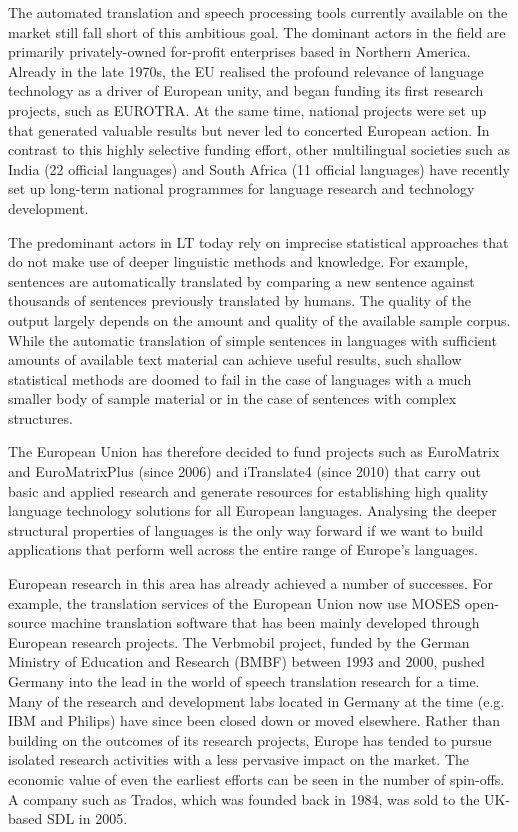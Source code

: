 \documentclass[]{../../metanetpaper}
\begin{document}
\begin{multicols}{2}

    The automated translation and speech processing tools currently available on the market still fall short of this ambitious goal. The dominant actors in the field are primarily privately-owned for-profit enterprises based in Northern America. Already in the late 1970s, the EU realised the profound relevance of language technology as a driver of European unity, and began funding its first research projects, such as EUROTRA. At the same time, national projects were set up that generated valuable results but never led to concerted European action. In contrast to this highly selective funding effort, other multilingual societies such as India (22 official languages) and South Africa (11 official languages) have recently set up long-term national programmes for language research and technology development. 

    The predominant actors in LT today rely on imprecise statistical approaches that do not make use of deeper linguistic methods and knowledge. For example, sentences are automatically translated by comparing a new sentence against thousands of sentences previously translated by humans. The quality of the output largely depends on the amount and quality of the available sample corpus. While the automatic translation of simple sentences in languages with sufficient amounts of available text material can achieve useful results, such shallow statistical methods are doomed to fail in the case of languages with a much smaller body of sample material or in the case of sentences with complex structures.

    The European Union has therefore decided to fund projects such as EuroMatrix and EuroMatrixPlus (since 2006) and iTranslate4 (since 2010) that carry out basic and applied research and generate resources for establishing high quality language technology solutions for all European languages. Analysing the deeper structural properties of languages is the only way forward if we want to build applications that perform well across the entire range of Europe’s languages.

    European research in this area has already achieved a number of successes. For example, the translation services of the European Union now use MOSES open-source machine translation software that has been mainly developed through European research projects. The Verbmobil project, funded by the German Ministry of Education and Research (BMBF) between 1993 and 2000, pushed Germany into the lead in the world of speech translation research for a time. Many of the research and development labs located in Germany at the time (e.g. IBM and Philips) have since been closed down or moved elsewhere. Rather than building on the outcomes of its research projects, Europe has tended to pursue isolated research activities with a less pervasive impact on the market. The economic value of even the earliest efforts can be seen in the number of spin-offs. A company such as Trados, which was founded back in 1984, was sold to the UK-based SDL in 2005.


\end{multicols}
\end{document}
